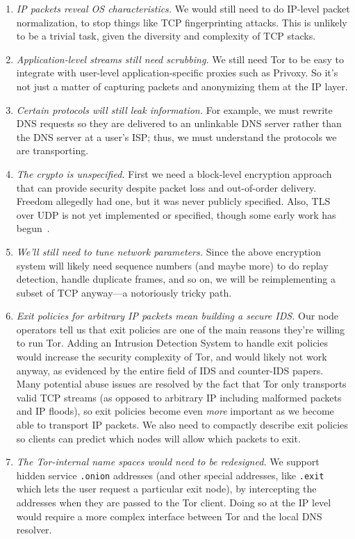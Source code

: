 \documentclass{llncs}
\begin{document}
\begin{enumerate}
\setlength{\itemsep}{0mm}
\setlength{\parsep}{0mm}
\item \emph{IP packets reveal OS characteristics.}  We would still need to do
IP-level packet normalization, to stop things like TCP fingerprinting
attacks. %
This is unlikely to be a trivial task, given the diversity and complexity of
TCP stacks.
\item \emph{Application-level streams still need scrubbing.} We still need
Tor to be easy to integrate with user-level application-specific proxies
such as Privoxy. So it's not just a matter of capturing packets and
anonymizing them at the IP layer.
\item \emph{Certain protocols will still leak information.} For example, we
must rewrite DNS requests so they are delivered to an unlinkable DNS server
rather than the DNS server at a user's ISP; thus, we must understand the
protocols we are transporting.
\item \emph{The crypto is unspecified.} First we need a block-level encryption
approach that can provide security despite
packet loss and out-of-order delivery. Freedom allegedly had one, but it was
never publicly specified.
Also, TLS over UDP is not yet implemented or
specified, though some early work has begun~\cite{dtls}.
\item \emph{We'll still need to tune network parameters.} Since the above
encryption system will likely need sequence numbers (and maybe more) to do
replay detection, handle duplicate frames, and so on, we will be reimplementing
a subset of TCP anyway---a notoriously tricky path.
\item \emph{Exit policies for arbitrary IP packets mean building a secure
IDS\@.}  Our node operators tell us that exit policies are one of
the main reasons they're willing to run Tor.
Adding an Intrusion Detection System to handle exit policies would
increase the security complexity of Tor, and would likely not work anyway,
as evidenced by the entire field of IDS and counter-IDS papers. Many
potential abuse issues are resolved by the fact that Tor only transports
valid TCP streams (as opposed to arbitrary IP including malformed packets
and IP floods), so exit policies become even \emph{more} important as
we become able to transport IP packets. We also need to compactly
describe exit policies so clients can predict
which nodes will allow which packets to exit.
\item \emph{The Tor-internal name spaces would need to be redesigned.} We
support hidden service {\tt{.onion}} addresses (and other special addresses,
like {\tt{.exit}} which lets the user request a particular exit node),
by intercepting the addresses when they are passed to the Tor client.
Doing so at the IP level would require a more complex interface between
Tor and the local DNS resolver.
\end{enumerate}
\end{document}
